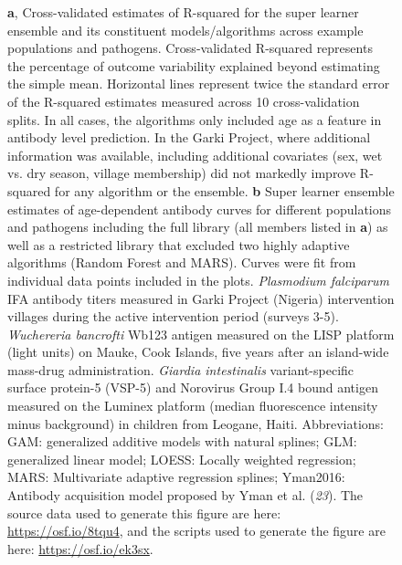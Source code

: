 \documentclass[11pt]{article}
\begin{document}
\begin{landscape}
\begin{figure}[htbp]
\begin{center}
\begin{minipage}{1.4\textwidth}
\caption{\textbf{a}, Cross-validated estimates of R-squared for the super learner ensemble and its constituent models/algorithms across example populations and pathogens. Cross-validated R-squared represents the percentage of outcome variability explained beyond estimating the simple mean. Horizontal lines represent twice the standard error of the R-squared estimates measured across 10 cross-validation splits. In all cases, the algorithms only included age as a feature in antibody level prediction. In the Garki Project, where additional information was available, including additional covariates (sex, wet vs. dry season, village membership) did not markedly improve R-squared for any algorithm or the ensemble.
\textbf{b} Super learner ensemble  estimates of age-dependent antibody curves for different populations and pathogens including the full library (all members listed in \textbf{a}) as well as a restricted library that excluded two highly adaptive algorithms (Random Forest and MARS). Curves were fit from individual data points included in the plots. 
\textit{Plasmodium falciparum} IFA antibody titers measured in Garki Project (Nigeria) intervention villages during the active intervention period (surveys 3-5). \textit{Wuchereria bancrofti} Wb123 antigen measured on the LISP platform (light units) on Mauke, Cook Islands, five years after an island-wide mass-drug administration. \textit{Giardia intestinalis} variant-specific surface protein-5 (VSP-5) and Norovirus Group I.4 bound antigen measured on the Luminex platform (median fluorescence intensity minus background) in children from Leogane, Haiti.
Abbreviations: GAM: generalized additive models with natural splines; GLM: generalized linear model; LOESS: Locally weighted regression; MARS: Multivariate adaptive regression splines; Yman2016: Antibody acquisition model proposed by Yman et al. (\textit{23}).
The source data used to generate this figure are here: \url{https://osf.io/8tqu4}, and the scripts used to generate the figure are here: \url{https://osf.io/ek3sx}. 
}
\label{fig:CVSL}
\end{minipage}
\end{center}
\end{figure}
\end{landscape}




%
\end{document}
